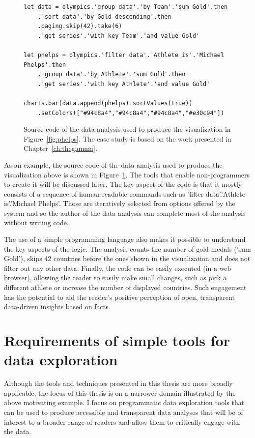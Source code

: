 \documentclass[fleqn,11pt]{report}
\newcommand{\ident}[1]{\textnormal{\ttfamily #1}}
\theoremstyle{definition}
\begin{document}
\begin{figure}[t]
\begin{lstlisting}[language=thegamma]
let data = olympics.'group data'.'by Team'.'sum Gold'.then
    .'sort data'.'by Gold descending'.then
    .paging.skip(42).take(6)
    .'get series'.'with key Team'.'and value Gold'

let phelps = olympics.'filter data'.'Athlete is'.'Michael Phelps'.then
    .'group data'.'by Athlete'.'sum Gold'.then
    .'get series'.'with key Athlete'.'and value Gold'

charts.bar(data.append(phelps).sortValues(true))
    .setColors(["#94c8a4","#94c8a4","#94c8a4","#e30c94"])
\end{lstlisting}
\caption{Source code of the data analysis used to produce the visualization in
Figure~\ref{fig:phelps}. The case study is based on the work presented in Chapter~\ref{ch:thegamma}.}
\label{fig:gamma}
\end{figure}

As an example, the source code of the data analysis used to produce the visualization above is shown
in Figure~\ref{fig:gamma}. The tools that enable non-programmers to create it will be discussed
later. The key aspect of the code is that it mostly consists of a sequence of human-readable
commands such as \ident{'filter data'.'Athlete is'.'Michael Phelps'}. Those are iteratively
selected from options offered by the system and so the author of the data analysis can complete
most of the analysis without writing code.

The use of a simple programming language also makes it possible to understand the key
aspects of the logic. The analysis counts the number of gold medals (\ident{'sum Gold'}),
skips 42 countries before the ones shown in the visualization and does not filter out any
other data. Finally, the code can be easily executed (in a web browser), allowing the reader
to easily make small changes, such as pick a different athlete or increase the number of displayed
countries. Such engagement has the potential to aid the reader's positive perception of open,
transparent data-driven insights based on facts.

\section{Requirements of simple tools for data exploration}

Although the tools and techniques presented in this thesis are more broadly applicable,
the focus of this thesis is on a narrower domain illustrated by the above motivating example.
I focus on programmatic data exploration tools that can be used to produce accessible and
transparent data analyses that will be of interest to a broader range of readers and allow
them to critically engage with the data.
\end{document}

